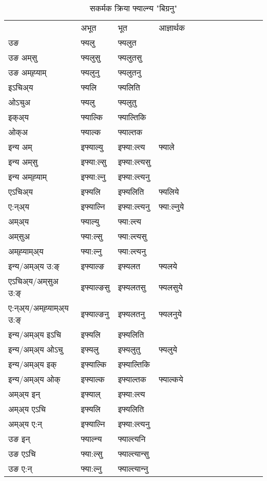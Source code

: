 \begin{table}[H]
\centering
\caption{\label{ɛl.vt} सकर्मक क्रिया  फ्याल्न्य  "बिग्रनु"  }
\begin{tabular}{l|l|l|l|l|l|l|l|l|l|l|l|l}  \toprule
&अभूत & भूत & आज्ञार्थक \\ 
उङ &फ्यलु &फ्यलुत \\ 
उङ अम्‌सु &फ्यलुसु &फ्यलुतसु \\ 
उङ अम्‌ह्‍याम् &फ्यलुनु &फ्यलुतनु \\ 
इऽचिअ्य &फ्यलि &फ्यलिति   \\ 
ओऽचुअ &फ्यलु &फ्यलुतु   \\ 
इक्अ्य &फ्याल्कि &फ्याल्तिकि   \\ 
ओक्अ &फ्याल्क &फ्याल्तक   \\ 
इन्य अम् & इफ्याल्यु  & इफ्या:ल्त्य &फ्याले  \\ 
इन्य अम्‌सु & इफ्या:ल्सु  & इफ्या:ल्त्यसु   \\ 
इन्य अम्‌ह्‍याम् & इफ्या:ल्नु  & इफ्या:ल्त्यनु   \\ 
एऽचिअ्य & इफ्यलि & इफ्यलिति &फ्यलिये    \\ 
ए:न्अ्य & इफ्याल्नि  & इफ्या:ल्त्यनु &फ्या:ल्नुये  \\ 
अम्अ्य & फ्याल्यु  & फ्या:ल्त्य  \\ 
अम्‌सुअ & फ्या:ल्सु & फ्या:ल्त्यसु  \\ 
अम्‌ह्‍याम्अ्य & फ्या:ल्नु  & फ्या:ल्त्यनु \\ 
\midrule
इन्य/अम्अ्य उ:ङ्‌&इफ्याल्ङ & इफ्यलत &फ्यलये \\ 
एऽचिअ्य/अम्‌सुअ उ:ङ्‌ &इफ्याल्ङसु & इफ्यलतसु &फ्यलसुये \\ 
ए:न्अ्य/अम्‌ह्‍याम्अ्य उ:ङ्‌ &इफ्याल्ङनु & इफ्यलतनु &फ्यलनुये \\ 
इन्य/अम्अ्य इऽचि & इफ्यलि & इफ्यलिति    \\ 
इन्य/अम्अ्य ओऽचु & इफ्यलु & इफ्यलुतु  &फ्यलुये  \\ 
इन्य/अम्अ्य इक् & इफ्याल्कि & इफ्याल्तिकि   \\ 
इन्य/अम्अ्य ओक् & इफ्याल्क & इफ्याल्तक  &फ्याल्कये  \\ 
अम्अ्य इन् & इफ्याल् & इफ्या:ल्त्य   \\ 
अम्अ्य एऽचि & इफ्यलि & इफ्यलिति    \\ 
अम्अ्य ए:न् & इफ्याल्नि  & इफ्या:ल्त्यनु  \\ 
\midrule
उङ इन् & फ्याल्न्य  & फ्याल्त्यनि  \\ 
उङ एऽचि & फ्या:ल्सु  & फ्याल्त्यान्सु   \\ 
उङ ए:न्& फ्या:ल्नु  & फ्याल्त्यान्‍नु   \\ 
\bottomrule
\end{tabular}
\end{table}


